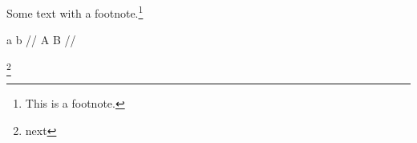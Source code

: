 






Some text with a footnote.\footnote{This is a footnote.}

\ex[uniformwrapbaselines=false]
\begingl
\gla a{\vrule depth10pt}{\putfnno} b //
\glb A B //
\endgl
\xe

\footnote{next}

\bye
